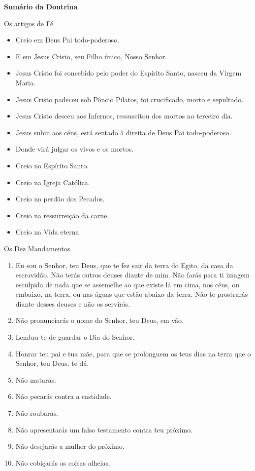 \documentclass{book}
\begin{document}
\newpage
\begin{center}
    \textbf{Sumário da Doutrina}
\end{center}
\begin{center}
    Os artigos de Fé
\end{center}
\begin{itemize}
    \item Creio em Deus Pai todo-poderoso.
    \item E em Jesus Cristo, seu Filho único, Nosso Senhor.
    \item Jesus Cristo foi concebido pelo poder do Espírito Santo, nasceu da Virgem Maria.
    \item Jesus Cristo padeceu sob Pôncio Pilatos, foi crucificado, morto e sepultado.
    \item Jesus Cristo desceu aos Infernos, ressuscitou dos mortos no terceiro dia.
    \item Jesus subiu aos céus, está sentado à direita de Deus Pai todo-poderoso.
    \item Donde virá julgar os vivos e os mortos.
    \item Creio no Espírito Santo.
    \item Creio na Igreja Católica.
    \item Creio no perdão dos Pecados.
    \item Creio na ressurreição da carne.
    \item Creio na Vida eterna.
\end{itemize}
\begin{center}
    Os Dez Mandamentos
\end{center}
\begin{enumerate}
    \item Eu sou o Senhor, teu Deus, que te fez sair da terra do Egito, da casa da escravidão. Não terás outros deuses diante de mim. Não farás para ti imagem esculpida de nada que se assemelhe ao que existe lá em cima, nos céus, ou embaixo, na terra, ou nas águas que estão abaixo da terra. Não te prostrarás diante desses deuses e não os servirás.
    \item Não pronunciarás o nome do Senhor, teu Deus, em vão.
    \item Lembra-te de guardar o Dia do Senhor.
    \item Honrar teu pai e tua mãe, para que se prolonguem os teus dias na terra que o Senhor, teu Deus, te dá.
    \item Não matarás.
    \item Não pecarás contra a castidade.
    \item Não roubarás.
    \item Não apresentarás um falso testamento contra teu próximo.
    \item Não desejarás a mulher do próximo.
    \item Não cobiçarás as coisas alheias.
\end{enumerate}
\end{document}

